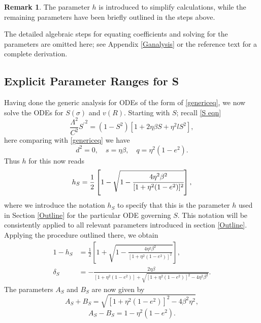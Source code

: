 \documentclass[12pt,oneside]{report}
\theoremstyle{definition}
\newtheorem{remark}{Remark}
\begin{document}
\begin{remark}
    The parameter $h$ is introduced to simplify calculations, while the remaining parameters have been briefly outlined in the steps above.
\end{remark}

The detailed algebraic steps for equating coefficients and solving for the parameters are omitted here; see Appendix \ref{Ganalysis} or the reference text \cite{o2008integrable} for a complete derivation.  

\subsection{Explicit Parameter Ranges for S}
Having done the generic analysis for ODEs of the form of \autoref{genericeq}, we now solve the ODEs for $S(\sigma)$ and $v(R)$. Starting with $S$; recall \autoref{S eqn}
\begin{equation}
    \frac{\Lambda^{2}}{C^{2}}{S^{\prime}}^{2} = (1-S^{2})\left[ 1+2\eta\beta S + \eta^{2}lS^{2} \right],
\end{equation}
here comparing with \autoref{genericeq} we have 
\begin{equation}
    d^{2} = 0 , \quad s=\eta\beta , \quad q = \eta^{2}(1-e^{2}).
\end{equation}
Thus $h$ for this now reads
\begin{equation}
    h_{S} = \frac{1}{2}\left[1 - \sqrt{1 - \cfrac{4\eta^{2}\beta^{2}}{[1+\eta^{2}(1-e^{2})]^{2}}} \right],
\end{equation}
where we introduce the notation $h_{S}$ to specify that this is the parameter $h$ used in Section \ref{Outline} for the particular ODE governing $S$. This notation will be consistently applied to all relevant parameters introduced in section \ref{Outline}. Applying the procedure outlined there, we obtain
\begin{align}
    1-h_{S} &= \frac{1}{2} \left[ 1+ \sqrt{1 - \frac{4\eta^{2}\beta^{2}}{[1+\eta^{2}(1-e^{2})]^{2}}} \right],\\
    \delta_{S} &= -\frac{2\eta\beta}{[1+\eta^{2}(1-e^{2})] + \sqrt{[1+\eta^{2}(1-e^{2})]^{2}-4\eta^{2}\beta^{2}}}.
\end{align}
The parameters $A_{S}$ and $B_{S}$ are now given by
\begin{equation}
    A_{S}+B_{S} = \sqrt{[1+\eta^{2}(1-e^{2})]^{2}-4\beta^{2}\eta^{2}},
\end{equation}
\begin{equation}
    A_{S}-B_{S} = 1-\eta^{2}(1-e^{2}).
\end{equation}
\end{document}
